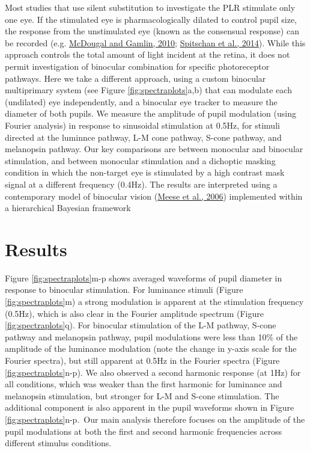 \documentclass[
]{article}
\begin{document}
Most studies that use silent substitution to investigate the PLR stimulate only one eye. If the stimulated eye is pharmacologically dilated to control pupil size, the response from the unstimulated eye (known as the consensual response) can be recorded (e.g. \protect\hyperlink{ref-McDougal2010}{McDougal and Gamlin, 2010}; \protect\hyperlink{ref-Spitschan2014}{Spitschan et al., 2014}). While this approach controls the total amount of light incident at the retina, it does not permit investigation of binocular combination for specific photoreceptor pathways. Here we take a different approach, using a custom binocular multiprimary system (see Figure \ref{fig:spectraplots}a,b) that can modulate each (undilated) eye independently, and a binocular eye tracker to measure the diameter of both pupils. We measure the amplitude of pupil modulation (using Fourier analysis) in response to sinusoidal stimulation at 0.5Hz, for stimuli directed at the luminnce pathway, L-M cone pathway, S-cone pathway, and melanopsin pathway. Our key comparisons are between monocular and binocular stimulation, and between monocular stimulation and a dichoptic masking condition in which the non-target eye is stimulated by a high contrast mask signal at a different frequency (0.4Hz). The results are interpreted using a contemporary model of binocular vision (\protect\hyperlink{ref-Meese2006}{Meese et al., 2006}) implemented within a hierarchical Bayesian framework

\hypertarget{results}{%
\section{Results}\label{results}}

Figure \ref{fig:spectraplots}m-p shows averaged waveforms of pupil diameter in response to binocular stimulation. For luminance stimuli (Figure \ref{fig:spectraplots}m) a strong modulation is apparent at the stimulation frequency (0.5Hz), which is also clear in the Fourier amplitude spectrum (Figure \ref{fig:spectraplots}q). For binocular stimulation of the L-M pathway, S-cone pathway and melanopsin pathway, pupil modulations were less than 10\% of the amplitude of the luminance modulation (note the change in y-axis scale for the Fourier spectra), but still apparent at 0.5Hz in the Fourier spectra (Figure \ref{fig:spectraplots}n-p). We also observed a second harmonic response (at 1Hz) for all conditions, which was weaker than the first harmonic for luminance and melanopsin stimulation, but stronger for L-M and S-cone stimulation. The additional component is also apparent in the pupil waveforms shown in Figure \ref{fig:spectraplots}n-p.~Our main analysis therefore focuses on the amplitude of the pupil modulations at both the first and second harmonic frequencies across different stimulus conditions.
\end{document}
